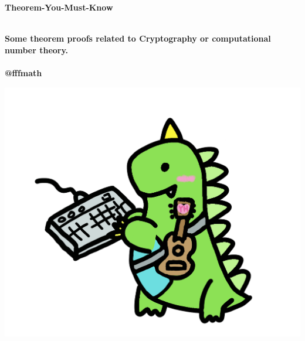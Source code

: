 
\thispagestyle{empty}

\vspace{3cm}
  \begin{center}
	\bfseries \Huge Theorem-You-Must-Know \par   %
        ~\\
	\bfseries \LARGE Some theorem proofs related to Cryptography or computational number theory. \\   %
        ~\\
        \bfseries \Large @fffmath \par   %

        \vspace{3cm}
    
      	{\centering \includegraphics[width=0.8\linewidth]{images/myavatar.png}}
    \end{center}
    
\par

\newpage
